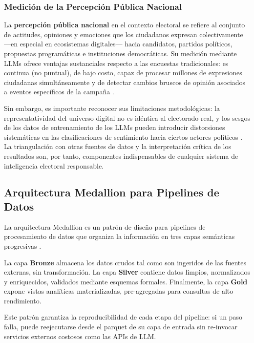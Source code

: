 \documentclass[listof=nochaptergap,12pt,times,authoryear]{report}
\begin{document}
\subsubsection{Medición de la Percepción Pública Nacional}
 
La \textbf{percepción pública nacional} en el contexto electoral se refiere al conjunto de actitudes, opiniones y emociones que los ciudadanos expresan colectivamente —en especial en ecosistemas digitales— hacia candidatos, partidos políticos, propuestas programáticas e instituciones democráticas. Su medición mediante LLMs ofrece ventajas sustanciales respecto a las encuestas tradicionales: es continua (no puntual), de bajo costo, capaz de procesar millones de expresiones ciudadanas simultáneamente y de detectar cambios bruscos de opinión asociados a eventos específicos de la campaña \parencite{pr_gujral2024llm_elections}.
 
Sin embargo, es importante reconocer sus limitaciones metodológicas: la representatividad del universo digital no es idéntica al electorado real, y los sesgos de los datos de entrenamiento de los LLMs pueden introducir distorsiones sistemáticas en las clasificaciones de sentimiento hacia ciertos actores políticos \parencite{pr_gujral2024llm_elections}. La triangulación con otras fuentes de datos y la interpretación crítica de los resultados son, por tanto, componentes indispensables de cualquier sistema de inteligencia electoral responsable.

\subsection{Arquitectura Medallion para Pipelines de Datos}

La arquitectura Medallion es un patrón de diseño para pipelines de procesamiento de datos que organiza la información en tres capas semánticas progresivas \parencite{bk_databricks2023medallion}.

La capa \textbf{Bronze} almacena los datos crudos tal como son ingeridos de las fuentes externas, sin transformación. La capa \textbf{Silver} contiene datos limpios, normalizados y enriquecidos, validados mediante esquemas formales. Finalmente, la capa \textbf{Gold} expone vistas analíticas materializadas, pre-agregadas para consultas de alto rendimiento.

Este patrón garantiza la reproducibilidad de cada etapa del pipeline: si un paso falla, puede reejecutarse desde el parquet de su capa de entrada sin re-invocar servicios externos costosos como las APIs de LLM.
\end{document}
